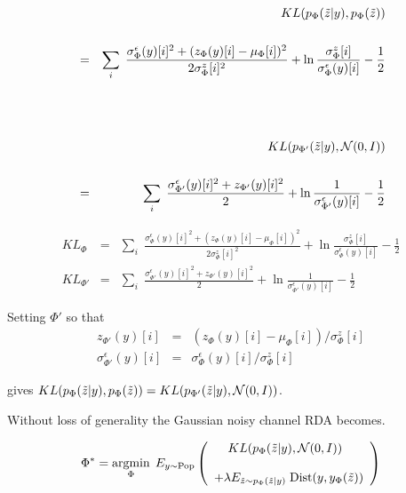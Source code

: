 {

\begin{eqnarray*}
 &  & KL(p_\Phi(\tilde{z}|y),p_\Phi(\tilde{z})) \\
 \\
 & = & \sum_i \;\frac{ \sigma^\epsilon_\Phi(y)[i]^2 +(z_\Phi(y)[i] - \mu_\Phi[i])^2}{2\sigma^z_\Phi[i]^2}
+ \ln\frac{\sigma^z_\Phi[i]}{\sigma^\epsilon_\Phi(y)[i]}
- \frac{1}{2}
\\
\\
\\
\\
 &  & KL(p_{\Phi'}(\tilde{z}|y),{\cal N}(0,I)) \\
 \\
 & = & \sum_i \;\frac{\sigma^\epsilon_{\Phi'}(y)[i]^2 +z_{\Phi'}(y)[i]^2}{2} + \ln\frac{1}{\sigma^\epsilon_{\Phi'}(y)[i]} - \frac{1}{2}
\end{eqnarray*}


\begin{eqnarray*}
KL_\Phi & = & \sum_i \;\frac{ \sigma^\epsilon_\Phi(y)[i]^2 +(z_\Phi(y)[i] - \mu_\Phi[i])^2}{2\sigma^z_\Phi[i]^2}
+ \ln\frac{\sigma^z_\Phi[i]}{\sigma^\epsilon_\Phi(y)[i]} - \frac{1}{2}
\\
KL_{\Phi'} & = & \sum_i \;\frac{\sigma^\epsilon_{\Phi'}(y)[i]^2 +z_{\Phi'}(y)[i]^2}{2} + \ln\frac{1}{\sigma^\epsilon_{\Phi'}(y)[i]} - \frac{1}{2}
\end{eqnarray*}

Setting $\Phi'$ so that
\begin{eqnarray*}
z_{\Phi'}(y)[i] & = & (z_\Phi(y)[i] - \mu_\Phi[i])/\sigma^z_\Phi[i] \\
\sigma^\epsilon_{\Phi'}(y)[i] & = & \sigma^\epsilon_\Phi(y)[i]/\sigma^z_\Phi[i]
\end{eqnarray*}

\vfill
gives {\color{red} $KL(p_{\Phi}(\tilde{z}|y),p_\Phi(\tilde{z})) = KL(p_{\Phi'}(\tilde{z}|y),{\cal N}(0,I))$}.


\vfill
Without loss of generality the Gaussian noisy channel RDA becomes.

{\color{red} $$\Phi^* = \operatorname*{argmin}_{\Phi}\; E_{y \sim \mathrm{Pop}}\left(\begin{array}{l}\;\;\;\;KL(p_\Phi(\tilde{z}|y),{\cal N}(0,I)) \\
\\
+ \lambda E_{\tilde{z} \sim p_\Phi(\tilde{z}|y)}\;\mathrm{Dist}(y,y_\Phi(\tilde{z}))\end{array}\right) $$}

}
